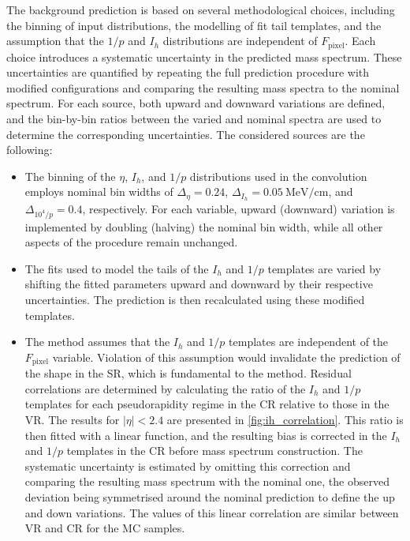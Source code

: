 The background prediction is based on several methodological choices, including the binning of input distributions, the modelling of fit tail templates, and the assumption that the $1/p$ and $I_h$ distributions are independent of $F_\textrm{pixel}$. Each choice introduces a systematic uncertainty in the predicted mass spectrum. These uncertainties are quantified by repeating the full prediction procedure with modified configurations and comparing the resulting mass spectra to the nominal spectrum. For each source, both upward and downward variations are defined, and the bin-by-bin ratios between the varied and nominal spectra are used to determine the corresponding uncertainties. The considered sources are the following:
\begin{itemize}
    \item The binning of the $\eta$, $I_h$, and $1/p$ distributions used in the convolution employs nominal bin widths of $\Delta_{\eta} = 0.24$, $\Delta_{I_h} = 0.05~\mathrm{MeV/cm}$, and $\Delta_{10^4/p} = 0.4$, respectively. For each variable, upward (downward) variation is implemented by doubling (halving) the nominal bin width, while all other aspects of the procedure remain unchanged.
    \item The fits used to model the tails of the $I_h$ and $1/p$ templates are varied by shifting the fitted parameters upward and downward by their respective uncertainties. The prediction is then recalculated using these modified templates.
    \item The method assumes that the $I_h$ and $1/p$ templates are independent of the $F_\textrm{pixel}$ variable. Violation of this assumption would invalidate the prediction of the shape in the SR, which is fundamental to the method. Residual correlations are determined by calculating the ratio of the $I_h$ and $1/p$ templates for each pseudorapidity regime in the CR relative to those in the VR. The results for $|\eta|<2.4$ are presented in \cref{fig:ih_correlation}. This ratio is then fitted with a linear function, and the resulting bias is corrected in the $I_h$ and $1/p$ templates in the CR before mass spectrum construction. The systematic uncertainty is estimated by omitting this correction and comparing the resulting mass spectrum with the nominal one, the observed deviation being symmetrised around the nominal prediction to define the up and down variations. The values of this linear correlation are similar between VR and CR for the MC samples.
\end{itemize}



